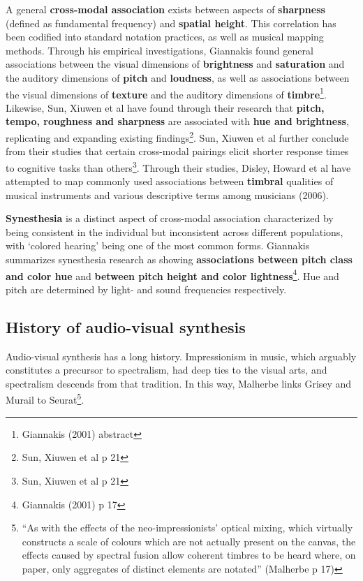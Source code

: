 \documentclass[sigconf]{nimeart}
\begin{document}
A general \textbf{cross-modal association} exists between aspects of \textbf{sharpness} (defined as fundamental frequency) and \textbf{spatial height}\cite{c13}. This correlation has been codified into standard notation practices, as well as musical mapping methods. Through his empirical investigations, Giannakis found general associations between the visual dimensions of \textbf{brightness} and \textbf{saturation} and the auditory dimensions of \textbf{pitch} and \textbf{loudness}, as well as associations between the visual dimensions of \textbf{texture} and the auditory dimensions of \textbf{timbre}\footnote{Giannakis (2001) abstract}. Likewise, Sun, Xiuwen et al have found through their research that \textbf{pitch, tempo, roughness and sharpness} are associated with \textbf{hue and brightness}, replicating and expanding existing findings\footnote{Sun, Xiuwen et al p 21}. Sun, Xiuwen et al further conclude from their studies that certain cross-modal pairings elicit shorter response times to cognitive tasks than others\footnote{Sun, Xiuwen et al p 21}. Through their studies, Disley, Howard et al have attempted to map commonly used associations between \textbf{timbral} qualities of musical instruments and various descriptive terms among musicians (2006)\cite{c14}.~

\textbf{Synesthesia} is a distinct aspect of cross-modal association characterized by being consistent in the individual but inconsistent across different populations, with `colored hearing' being one of the most common forms. Giannakis summarizes synesthesia research as showing \textbf{associations between pitch class and color hue} and \textbf{between pitch height and color lightness}\footnote{Giannakis (2001) p 17}. Hue and pitch are determined by light- and sound frequencies respectively.

\subsection{History of audio-visual synthesis}\label{history-of-audio-visual-synthesis}

Audio-visual synthesis has a long history. Impressionism in music, which arguably constitutes a precursor to spectralism, had deep ties to the visual arts, and spectralism descends from that tradition\cite{c15}. In this way, Malherbe links Grisey and Murail to Seurat\footnote{``As with the effects of the neo-impressionists' optical mixing, which virtually constructs a scale of colours which are not actually present on the canvas, the effects caused by spectral fusion allow coherent timbres to be heard where, on paper, only aggregates of distinct elements are notated'' (Malherbe p 17)

\hfill\break}\cite{c16}.
\end{document}
